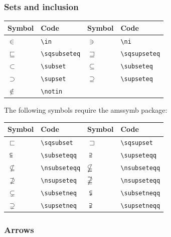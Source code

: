 \documentclass[a4paper,14pt]{extarticle}
\begin{document}
\subsubsection{Sets and inclusion}

\begin{center}
\begin{tabular}{|p{}p{}|p{}p{}|}
\hline
Symbol & Code & Symbol & Code \\
\hline
\(\in\) & \verb=\in= & \(\ni\) & \verb=\ni= \\
\(\sqsubseteq\) & \verb=\sqsubseteq= & \(\sqsupseteq\) & \verb=\sqsupseteq= \\ 
\(\subset\) & \verb=\subset= & \(\subseteq\) & \verb=\subseteq= \\
\(\supset\) & \verb=\supset= & \(\supseteq\) & \verb=\supseteq= \\
\hline
\(\notin\) & \verb=\notin= & & \\ 
\hline
\end{tabular}
\end{center}

The following symbols require the amssymb package:
\begin{center}
\begin{tabular}{|p{}p{}|p{}p{}|}
\hline
Symbol & Code & Symbol & Code \\
\hline
\(\sqsubset\) & \verb=\sqsubset= & \(\sqsupset\) & \verb=\sqsupset= \\
\(\subseteqq\) & \verb=\subseteqq= & \(\supseteqq\) & \verb=\supseteqq= \\
\hline
\(\nsubseteq\) & \verb=\nsubseteqq= & \(\nsubseteqq\) & \verb=\nsubseteqq= \\
\(\nsupseteq\) & \verb=\nsupseteq= & \(\nsupseteqq\) & \verb=\nsupseteqq= \\
\(\subsetneq\) & \verb=\subsetneq= & \(\subsetneqq\) & \verb=\subsetneqq= \\
\(\supsetneq\) & \verb=\supsetneq= & \(\supsetneqq\) & \verb=\supsetneqq= \\
\hline
\end{tabular}
\end{center}


\subsubsection{Arrows}
\end{document}
